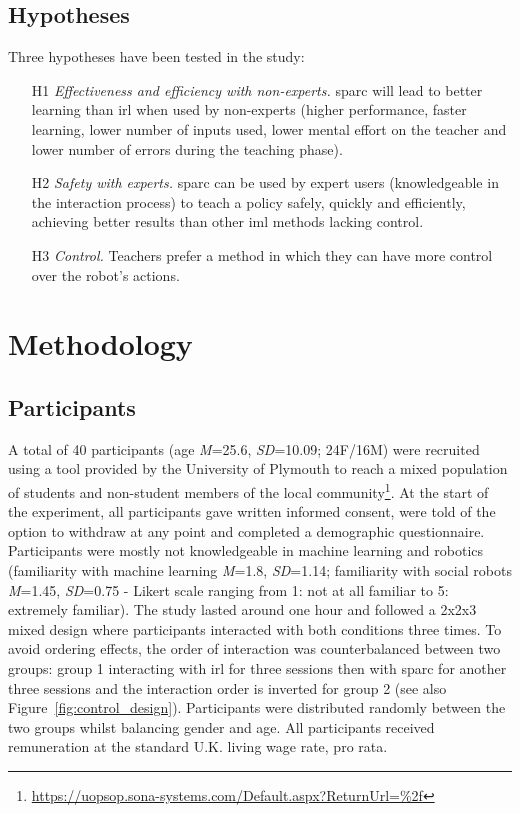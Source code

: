 \subsection{Hypotheses}

Three hypotheses have been tested in the study:

\begin{enumerate}
	\item [H1] \textit{Effectiveness and efficiency with non-experts.} \gls{sparc} will lead to better learning than \gls{irl} when used by non-experts (higher performance, faster learning, lower number of inputs used, lower mental effort on the teacher and lower number of errors during the teaching phase). %
	\item [H2] \textit{Safety with experts.} \gls{sparc} can be used by expert users (knowledgeable in the interaction process) to teach a policy safely, quickly and efficiently, achieving better results than other \gls{iml} methods lacking control.
	\item [H3] \textit{Control.} Teachers prefer a method in which they can have more control over the robot's actions.
\end{enumerate}
\section{Methodology}
\subsection{Participants}

A total of 40 participants (age \textit{M}=25.6, \textit{SD}=10.09; 24F/16M) were recruited using a tool provided by the University of Plymouth to reach a mixed population of students and non-student members of the local community\footnote{\url{https://uopsop.sona-systems.com/Default.aspx?ReturnUrl=\%2f}}. At the start of the experiment, all participants gave written informed consent, were told of the option to withdraw at any point and completed a demographic questionnaire. Participants were mostly not knowledgeable in machine learning and robotics (familiarity with machine learning \textit{M}=1.8, \textit{SD}=1.14; familiarity with social robots \textit{M}=1.45, \textit{SD}=0.75 - Likert scale ranging from 1: not at all familiar to 5: extremely familiar). The study lasted around one hour and followed a 2x2x3 mixed design where participants interacted with both conditions three times. To avoid ordering effects, the order of interaction was counterbalanced between two groups: group 1 interacting with \gls{irl} for three sessions then with \gls{sparc} for another three sessions and the interaction order is inverted for group 2 (see also Figure~\ref{fig:control_design}). Participants were distributed randomly between the two groups whilst balancing gender and age. All participants received remuneration at the standard U.K. living wage rate, pro rata. 

